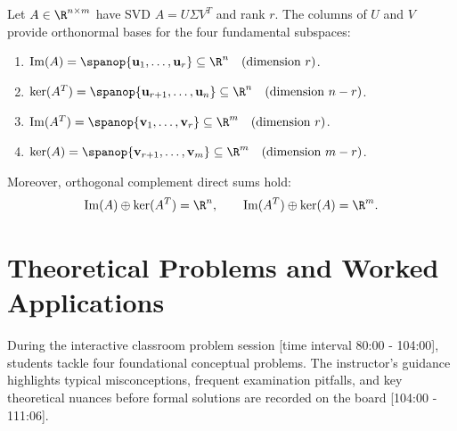 \begin{theorem}
\label{thm:subspaces-svd-general-en}
Let $A \in \R^{n \times m}$ have SVD $A = U \Sigma V^T$ and rank $r$. The columns of $U$ and $V$ provide orthonormal bases for the four fundamental subspaces:
\begin{enumerate}
    \item $\operatorname{Im}(A) = \spanop\{\mathbf{u}_1, \dots, \mathbf{u}_r\} \subseteq \R^n \quad (\text{dimension } r)$.
    \item $\ker(A^T) = \spanop\{\mathbf{u}_{r+1}, \dots, \mathbf{u}_n\} \subseteq \R^n \quad (\text{dimension } n - r)$.
    \item $\operatorname{Im}(A^T) = \spanop\{\mathbf{v}_1, \dots, \mathbf{v}_r\} \subseteq \R^m \quad (\text{dimension } r)$.
    \item $\ker(A) = \spanop\{\mathbf{v}_{r+1}, \dots, \mathbf{v}_m\} \subseteq \R^m \quad (\text{dimension } m - r)$.
\end{enumerate}
Moreover, orthogonal complement direct sums hold:
\begin{equation}
    \operatorname{Im}(A) \oplus \ker(A^T) = \R^n, \qquad \operatorname{Im}(A^T) \oplus \ker(A) = \R^m.
\end{equation}
\end{theorem}

\FloatBarrier
\section{Theoretical Problems and Worked Applications}
\label{sec:svd-problems-applications-en}

During the interactive classroom problem session [time interval 80:00 - 104:00], students tackle four foundational conceptual problems. The instructor's guidance highlights typical misconceptions, frequent examination pitfalls, and key theoretical nuances before formal solutions are recorded on the board [104:00 - 111:06].

